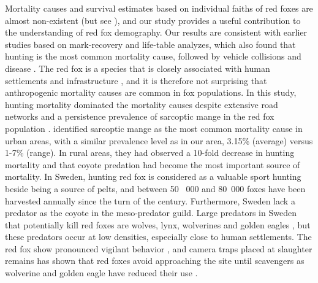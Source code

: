 \documentclass[12pt,a4paper,final,abstract=true,headings=small]{scrartcl}
\begin{document}
Mortality causes and survival estimates based on individual faiths of red foxes are almost non-existent (but see \citet{gosselinkSurvivalCauseSpecificMortality2007}), and our study provides a useful contribution to the understanding of red fox demography. Our results are consistent with earlier studies based on mark-recovery and life-table analyzes, which also found that hunting is the most common mortality cause, followed by vehicle collisions and disease \citep{gosselinkSurvivalCauseSpecificMortality2007,heydonDemographyRuralFoxes2000,yonedaEffectsHuntingAge1982,goszczynskiPopulationDynamicsRed1989,harrisDemographyTwoUrban1987,willebrandDecliningSurvivalRates2022}. The red fox is a species that is closely associated with human settlements and infrastructure \citep{jahrenImpactHumanLand2020}, and it is therefore not surprising that anthropogenic mortality causes are common in fox populations. In this study, hunting mortality dominated the mortality causes despite extensive road networks and a persistence prevalence of sarcoptic mange in the red fox population \citep{carricondo-sanchezRangeMangeSpatiotemporal2017}.\citet{gosselinkSurvivalCauseSpecificMortality2007} identified sarcoptic mange as the most common mortality cause in urban areas, with a similar prevalence level as in our area, 3.15\% (average) versus 1-7\% (range). In rural areas, they had observed a 10-fold decrease in hunting mortality and that coyote predation had become the most important source of mortality. In Sweden, hunting red fox is considered as a valuable sport hunting beside being a source of pelts, and between 50~ 000 and 80~000 foxes have been harvested annually since the turn of the century. Furthermore, Sweden lack a predator as the coyote in the meso-predator guild. Large predators in Sweden that potentially kill red foxes are  wolves, lynx, wolverines and golden eagles \citep{helldinLynxLynxLynx2006,sulkavaChangesDietGolden1999,vandijkForagingStrategiesWolverines2008}, but these predators occur at low densities, especially close to human settlements. The red fox show pronounced vigilant behavior \citep{berger-talLookYouLeap2009}, and camera traps placed at slaughter remains has shown that red foxes avoid approaching the site until scavengers as wolverine and golden eagle have reduced their use  \citep{gomoScavengingPulsedResource2017}.
\end{document}
